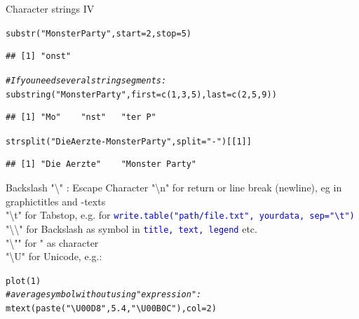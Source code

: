 \documentclass[xcolor=table,           xcolor=dvipsnames]{beamer}\usepackage[]{graphicx}\usepackage[]{color}
\makeatletter
\newcommand{\hlnum}[1]{\textcolor[rgb]{0,0,0}{#1}}
\newcommand{\hlstr}[1]{\textcolor[rgb]{0.545,0.137,0.137}{#1}}
\newcommand{\hlcom}[1]{\textcolor[rgb]{0,0.392,0}{\textit{#1}}}
\newcommand{\hlstd}[1]{\textcolor[rgb]{0,0,0}{#1}}
\newcommand{\hlkwc}[1]{\textcolor[rgb]{1,0,1}{#1}}
\newcommand{\hlkwd}[1]{\textcolor[rgb]{0,0,1}{#1}}
\newenvironment{kframe}{%
 \def\at@end@of@kframe{}%
 \ifinner\ifhmode%
  \def\at@end@of@kframe{\end{minipage}}%
  \begin{minipage}{\columnwidth}%
 \fi\fi%
 \def\FrameCommand##1{\hskip\@totalleftmargin \hskip-\fboxsep
 \colorbox{shadecolor}{##1}\hskip-\fboxsep
     \hskip-\linewidth \hskip-\@totalleftmargin \hskip\columnwidth}%
 \MakeFramed {\advance\hsize-\width
   \@totalleftmargin\z@ \linewidth\hsize
   \@setminipage}}%
 {\par\unskip\endMakeFramed%
 \at@end@of@kframe}
\newenvironment{knitrout}{}{} %
\newcommand{\rcode}[1]{\texttt{\textcolor{Blue}{#1}}} %
\makeatother
\begin{document}
\begin{frame}[fragile]{Character strings IV}
\begin{knitrout}
\color{fgcolor}\begin{kframe}
\begin{alltt}
\hlkwd{substr}\hlstd{(}\hlstr{"Monster Party"}\hlstd{,} \hlkwc{start}\hlstd{=}\hlnum{2}\hlstd{,} \hlkwc{stop}\hlstd{=}\hlnum{5}\hlstd{)}
\end{alltt}
\begin{verbatim}
## [1] "onst"
\end{verbatim}
\begin{alltt}
\hlcom{# If you need several string segments:}
\hlkwd{substring}\hlstd{(}\hlstr{"Monster Party"}\hlstd{,} \hlkwc{first}\hlstd{=}\hlkwd{c}\hlstd{(}\hlnum{1}\hlstd{,}\hlnum{3}\hlstd{,}\hlnum{5}\hlstd{),} \hlkwc{last}\hlstd{=}\hlkwd{c}\hlstd{(}\hlnum{2}\hlstd{,}\hlnum{5}\hlstd{,}\hlnum{9}\hlstd{) )}
\end{alltt}
\begin{verbatim}
## [1] "Mo"    "nst"   "ter P"
\end{verbatim}
\begin{alltt}
\hlkwd{strsplit}\hlstd{(}\hlstr{"Die Aerzte - Monster Party"}\hlstd{,} \hlkwc{split}\hlstd{=}\hlstr{" - "}\hlstd{)[[}\hlnum{1}\hlstd{]]}
\end{alltt}
\begin{verbatim}
## [1] "Die Aerzte"    "Monster Party"
\end{verbatim}
\end{kframe}
\end{knitrout}
\end{frame}


\begin{frame}[fragile]{Backslash "\textbackslash" : Escape Character}
"\textbackslash n" for return or line break (newline), eg in graphictitles and -texts\\
"\textbackslash t" for Tabstop, e.g. for \rcode{write.table("path/file.txt", yourdata, sep="\textbackslash t")}\\
"\textbackslash \textbackslash" for Backslash as symbol in \rcode{title, text, legend} etc.\\
"\textbackslash "" for " as character\\
"\textbackslash U" for Unicode, e.g.:
\begin{knitrout}
\color{fgcolor}\begin{kframe}
\begin{alltt}
\hlkwd{plot}\hlstd{(}\hlnum{1}\hlstd{)}
\hlcom{# average symbol without using "expression":}
\hlkwd{mtext}\hlstd{(}\hlkwd{paste}\hlstd{(}\hlstr{"\textbackslash{}U00D8"}\hlstd{,} \hlnum{5.4}\hlstd{,} \hlstr{"\textbackslash{}U00B0 C"}\hlstd{),} \hlkwc{col}\hlstd{=}\hlnum{2}\hlstd{)}
\end{alltt}
\end{kframe}
\end{knitrout}
\end{frame}
\end{document}
